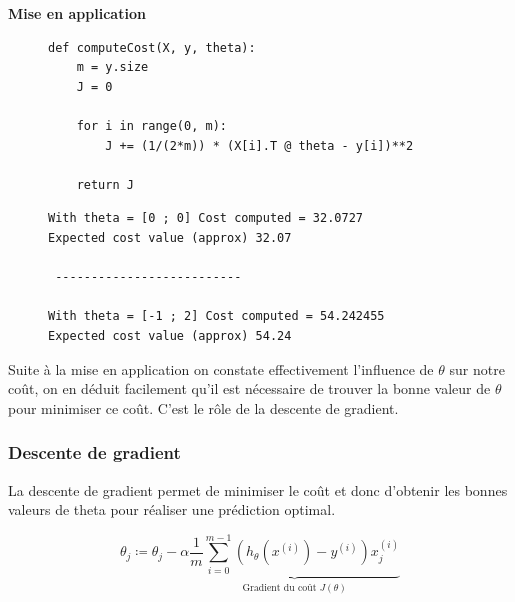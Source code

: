 \vspace{.5cm}
\noindent
\textbf{Mise en application}
\vspace{.2cm}


\begin{figure}[!h]
    \begin{minipage}{.48\linewidth}
\begin{verbatim}
def computeCost(X, y, theta):  
    m = y.size
    J = 0

    for i in range(0, m):
        J += (1/(2*m)) * (X[i].T @ theta - y[i])**2

    return J
\end{verbatim}   
    \end{minipage}\hfill
    \begin{minipage}{.48\linewidth}
\begin{verbatim}
With theta = [0 ; 0] Cost computed = 32.0727 
Expected cost value (approx) 32.07

 -------------------------- 

With theta = [-1 ; 2] Cost computed = 54.242455
Expected cost value (approx) 54.24
\end{verbatim}   
    \end{minipage}
\end{figure}

Suite à la mise en application on constate effectivement l'influence de $\theta$ sur notre coût, on en déduit facilement qu'il est nécessaire de trouver la bonne valeur de $\theta$ pour minimiser ce coût. C'est le rôle de la descente de gradient.



\subsubsection{Descente de gradient}

La descente de gradient permet de minimiser le coût et donc d'obtenir les bonnes valeurs de theta pour réaliser une prédiction optimal.

\begin{equation}\label{eq:cout}
    \theta_j \coloneqq \theta_j - \alpha \underbrace{\frac{1}{m} \sum_{i=0}^{m-1} (h_\theta(x^{(i)}) - y^{(i)}) x_j^{(i)}}_{\text{Gradient du coût $J(\theta)$}}
 \end{equation}


